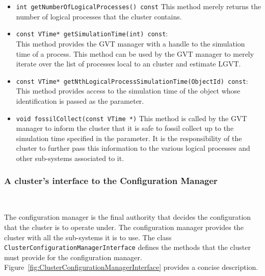 \begin{itemize}
\item {\tt int getNumberOfLogicalProcesses() const} This method merely
  returns the number of logical processes that the cluster contains.

\item {\tt const VTime* getSimulationTime(int) const}: \\
  This method provides the GVT manager with a handle to the simulation
  time of a process. This method can be used by the GVT manager to merely
  iterate over the list of processes local to an cluster and estimate
  LGVT.

\item {\tt const VTime* getNthLogicalProcessSimulationTime(ObjectId)
const}:\\ 
  This method provides access to the simulation time of the object whose
  identification is passed as the parameter. 

\item {\tt void fossilCollect(const VTime *)} This method is called by
  the GVT manager to inform the cluster that it is safe to fossil collect
  up to the simulation time specified in the parameter. It is the
  responsibility of the cluster to further pass this information to the
  various logical processes and other sub-systems associated to it.
\end{itemize}

\subsubsection{A cluster's interface to the Configuration Manager}

\begin{figure*}
\begin{center}
\ 
\end{center}
\caption{The interface a cluster should provide to a Configuration
  Manager.}\label{fig:ClusterConfigurationManagerInterface}    
\end{figure*}

The configuration manager is the final authority that decides the
configuration that the cluster is to operate under. The configuration
manager provides the cluster with all the sub-systems it is to use. The
class {\tt ClusterConfigurationManagerInterface} defines the methods that
the cluster must provide for the configuration manager.
Figure~\ref{fig:ClusterConfigurationManagerInterface} provides a concise
description.

